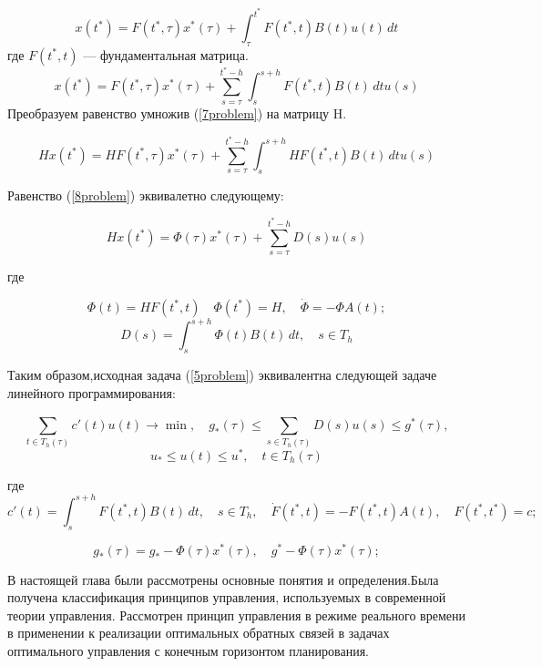 $$x(t^*) = F(t^*,\tau)x^*(\tau) + \int_{\tau}^{t^*} F(t^*,t)B(t)u(t)\,dt $$
где $F(t^*,t)$ — фундаментальная матрица.
\begin{equation} \label{7problem}
x(t^*) = F(t^*,\tau)x^*(\tau) +  \sum_{s=\tau}^{t^*-h}\int_{s}^{s+h} F(t^*,t)B(t)\,dt   u(s)
\end{equation}
Преобразуем равенство умножив (\ref{7problem}) на матрицу H.

\begin{equation} \label{8problem}
Hx(t^*) = HF(t^*,\tau)x^*(\tau) +  \sum_{s=\tau}^{t^*-h}\int_{s}^{s+h} HF(t^*,t)B(t)\,dt   u(s)
\end{equation}

Равенство  (\ref{8problem}) эквивалетно следующему:

$$Hx(t^*) = \Phi(\tau)x^*(\tau) +  \sum_{s=\tau}^{t^*-h}D(s)u(s)$$

где

$$\Phi(t) = HF(t^*,t) \quad \Phi(t^*) = H, \quad \dot{\Phi} = -\Phi A(t);$$
$$D(s) =\int_{s}^{s+h} \Phi(t)B(t)\,dt,\quad s\in T_h $$ 

Таким образом,исходная задача (\ref{5problem}) эквивалентна следующей задаче линейного программирования:

\begin{equation} \label{9problem}
\sum_{t\in T_h(\tau)}^{}c'(t)u(t) \to \min,\quad  g_*(\tau) \leq \sum_{s\in T_h(\tau)}^{}D(s)u(s) \leq g^*(\tau),
\end{equation}
$$ u_*\leq u(t) \leq u^*,\quad t \in T_h(\tau)$$

где
$$c'(t) = \int_{s}^{s+h} F(t^*,t)B(t)\,dt,\quad s\in T_h,\quad \dot F(t^*,t) = - F(t^*,t)A(t),\quad F(t^*,t^*) = c;$$

$$g_*(\tau) = g_* - \Phi(\tau)x^*(\tau),\quad g^* - \Phi(\tau)x^*(\tau);$$



В настоящей глава были рассмотрены основные понятия и определения.Была получена классификация принципов управления, используемых в современной теории управления. Рассмотрен принцип управления в режиме реального времени в применении к реализации оптимальных обратных связей в задачах оптимального управления с конечным горизонтом планирования.

\bigskip
